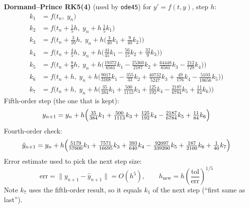 \documentclass[border=6pt]{standalone}
\begin{document}
\begin{minipage}{6.2in}
\textbf{Dormand--Prince RK5(4)} (used by \texttt{ode45}) for $y' = f(t, y)$, step $h$:
\begin{align*}
  k_1 &= f\bigl(t_n,\; y_n\bigr) \\
  k_2 &= f\bigl(t_n + \tfrac{1}{5}h,\; y_n + h\,\tfrac{1}{5}k_1\bigr) \\
  k_3 &= f\bigl(t_n + \tfrac{3}{10}h,\; y_n + h\bigl(\tfrac{3}{40}k_1 + \tfrac{9}{40}k_2\bigr)\bigr) \\
  k_4 &= f\bigl(t_n + \tfrac{4}{5}h,\; y_n + h\bigl(\tfrac{44}{45}k_1 - \tfrac{56}{15}k_2 + \tfrac{32}{9}k_3\bigr)\bigr) \\
  k_5 &= f\bigl(t_n + \tfrac{8}{9}h,\; y_n + h\bigl(\tfrac{19372}{6561}k_1 - \tfrac{25360}{2187}k_2 + \tfrac{64448}{6561}k_3 - \tfrac{212}{729}k_4\bigr)\bigr) \\
  k_6 &= f\bigl(t_n + h,\; y_n + h\bigl(\tfrac{9017}{3168}k_1 - \tfrac{355}{33}k_2 + \tfrac{46732}{5247}k_3 + \tfrac{49}{176}k_4 - \tfrac{5103}{18656}k_5\bigr)\bigr) \\
  k_7 &= f\bigl(t_n + h,\; y_n + h\bigl(\tfrac{35}{384}k_1 + \tfrac{500}{1113}k_3 + \tfrac{125}{192}k_4 - \tfrac{2187}{6784}k_5 + \tfrac{11}{84}k_6\bigr)\bigr)
\end{align*}
Fifth-order step (the one that is kept):
\[
  y_{n+1} = y_n + h\Bigl(\tfrac{35}{384}k_1 + \tfrac{500}{1113}k_3 + \tfrac{125}{192}k_4 - \tfrac{2187}{6784}k_5 + \tfrac{11}{84}k_6\Bigr)
\]
Fourth-order check:
\[
  \hat{y}_{n+1} = y_n + h\Bigl(\tfrac{5179}{57600}k_1 + \tfrac{7571}{16695}k_3 + \tfrac{393}{640}k_4 - \tfrac{92097}{339200}k_5 + \tfrac{187}{2100}k_6 + \tfrac{1}{40}k_7\Bigr)
\]
Error estimate used to pick the next step size:
\[
  \text{err} = \lVert y_{n+1} - \hat{y}_{n+1} \rVert = O(h^5),
  \qquad
  h_{\text{new}} = h \left(\frac{\text{tol}}{\text{err}}\right)^{1/5}
\]
Note $k_7$ uses the fifth-order result, so it equals $k_1$ of the next step (``first same as last'').
\end{minipage}
\hspace{2em}
\end{document}
